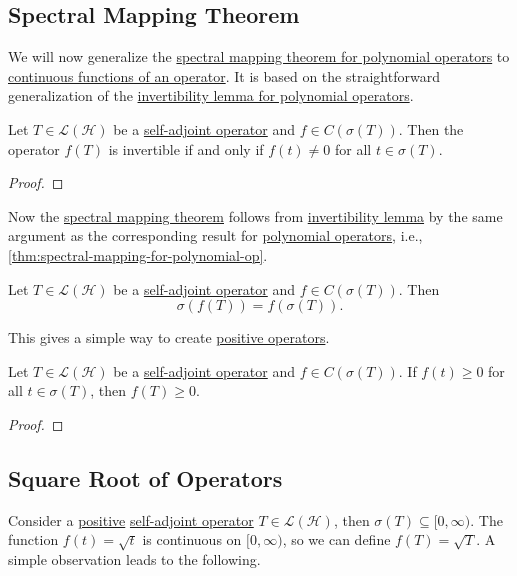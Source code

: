\subsection{Spectral Mapping Theorem}
We will now generalize the \hyperref[thm:spectral-mapping-for-polynomial-op]{spectral mapping theorem for polynomial operators} to \hyperref[def:continuous-function-op]{continuous functions of an operator}. It is based on the straightforward generalization of the \hyperref[lma:invertibility-for-polynomial-op]{invertibility lemma for polynomial operators}.

\begin{lemma}[Invertibility]\label{lma:invertibility}
	Let \(T\in \mathcal{L} (\mathcal{H} )\) be a \hyperref[def:self-adjoint-op]{self-adjoint operator} and \(f\in C(\sigma (T))\). Then the operator \(f(T)\) is invertible if and only if \(f(t) \neq 0\) for all \(t\in \sigma (T)\).
\end{lemma}
\begin{proof}

\end{proof}

Now the \hyperref[thm:spectral-mapping]{spectral mapping theorem} follows from \hyperref[lma:invertibility]{invertibility lemma} by the same argument as the corresponding result for \hyperref[def:polynomial-op]{polynomial operators}, i.e., \autoref{thm:spectral-mapping-for-polynomial-op}.

\begin{theorem}\label{thm:spectral-mapping}
	Let \(T\in \mathcal{L} (\mathcal{H} )\) be a \hyperref[def:self-adjoint-op]{self-adjoint operator} and \(f\in C(\sigma (T))\). Then
	\[
		\sigma (f(T)) = f(\sigma (T)).
	\]
\end{theorem}

This gives a simple way to create \hyperref[def:positive-op]{positive operators}.

\begin{corollary}
	Let \(T\in \mathcal{L} (\mathcal{H} )\) be a \hyperref[def:self-adjoint-op]{self-adjoint operator} and \(f\in C(\sigma (T))\). If \(f(t) \geq 0\) for all \(t\in \sigma (T)\), then \(f(T) \geq 0\).
\end{corollary}
\begin{proof}

\end{proof}

\subsection{Square Root of Operators}
Consider a \hyperref[def:positive-op]{positive} \hyperref[def:self-adjoint-op]{self-adjoint operator} \(T\in \mathcal{L} (\mathcal{H} )\), then \(\sigma (T) \subseteq [0, \infty )\). The function \(f(t) = \sqrt{t} \) is continuous on \([0, \infty )\), so we can define \(f(T) = \sqrt{T} \). A simple observation leads to the following.

